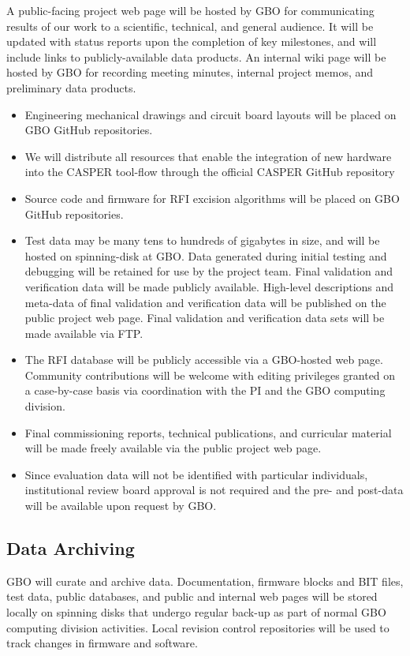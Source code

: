 \documentclass[10pt]{NSF}
\begin{document}
A public-facing project web page will be hosted by GBO for
communicating results of our work to a scientific, technical, and
general audience.  It will be updated with status reports upon the
completion of key milestones, and will include links to
publicly-available data products.  An internal wiki page will be
hosted by GBO for recording meeting minutes, internal project memos,
and preliminary data products.
\begin{itemize}
\item{Engineering mechanical drawings and circuit board layouts will
  be placed on GBO GitHub repositories.}
\item{We will distribute all resources that enable the integration of
  new hardware into the CASPER tool-flow through the official CASPER
  GitHub repository}
\item{Source code and firmware for RFI excision algorithms will be
  placed on GBO GitHub repositories.}
\item{Test data may be many tens to hundreds of gigabytes in size, and
  will be hosted on spinning-disk at GBO.  Data generated during
  initial testing and debugging will be retained for use by the
  project team.  Final validation and verification data will be made
  publicly available.  High-level descriptions and meta-data of final
  validation and verification data will be published on the public
  project web page.  Final validation and verification data sets will
  be made available via FTP.}
\item{The RFI database will be publicly accessible via a GBO-hosted
  web page.  Community contributions will be welcome with editing
  privileges granted on a case-by-case basis via coordination with the
  PI and the GBO computing division.}
\item{Final commissioning reports, technical publications, and
  curricular material will be made freely available via the public
  project web page.}
\item{Since evaluation data will not be identified with particular
  individuals, institutional review board approval is not required and
  the pre- and post-data will be available upon request by GBO.}
\end{itemize}

\subsection{Data Archiving}

GBO will curate and archive data.  Documentation, firmware blocks and
BIT files, test data, public databases, and public and internal
web pages will be stored locally on spinning disks that undergo regular
back-up as part of normal GBO computing division activities.  Local
revision control repositories will be used to track changes in
firmware and software.
\end{document}
